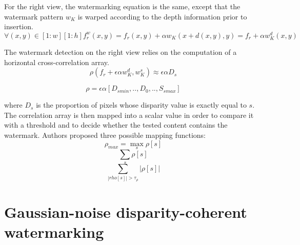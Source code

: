 For the right view, the watermarking equation is the same, except that the watermark pattern $w_{K}$ is warped according to the depth information prior to insertion.
\begin{equation}\label{eq:doerr3}
\forall(x,y) \in [1:w][1:h] f_{r}^{w}(x,y) = f_{r}(x,y)+\alpha w_{K}(x+d(x,y),y) = f_{r}+\alpha w_{K}^{d}(x,y)
\end{equation}


The watermark detection on the right view relies on the computation of a horizontal cross-correlation array.
\begin{equation}\label{eq:doerr4}
\rho (f_{r}+\epsilon\alpha w_{K}^{d},w_{K}^{s})\approx\epsilon\alpha D_{s}
\end{equation}

$$ \rho = \epsilon\alpha [D_{smin},..,D_{0},..,S_{smax}]$$


where $D_{s}$ is the proportion of pixels whose disparity value is exactly equal to $s$.\newline
The correlation array is then mapped into a scalar value in order to compare it with a threshold and to decide whether the tested content contains the watermark. Authors proposed three possible mapping functions:
\begin{equation}
\rho_{max}= \max_{s}\rho[s]
\end{equation}
\begin{equation}
 \sum_{s}\rho[s]
\end{equation}
\begin{equation}
\sum_{|rho[s]|>\tau_{\rho}}|\rho[s]|
\end{equation}

\section{Gaussian-noise disparity-coherent watermarking} 

